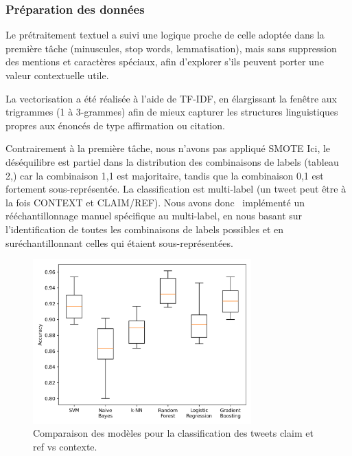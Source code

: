 \subsubsection{Préparation des données}
Le prétraitement textuel a suivi une logique proche de celle adoptée dans la première tâche (minuscules, stop words, lemmatisation), mais sans suppression des mentions et caractères 	spéciaux, afin d’explorer s’ils peuvent porter une valeur contextuelle utile.

La vectorisation a été réalisée à l’aide de TF-IDF, en élargissant la fenêtre aux trigrammes (1 à 3-grammes) afin de mieux capturer les structures linguistiques propres aux énoncés de type affirmation ou citation.

Contrairement à la première tâche, nous n’avons pas appliqué SMOTE Ici, le déséquilibre est partiel dans la distribution des combinaisons de labels (tableau 2,) car la combinaison {1,1} est majoritaire, tandis que la combinaison {0,1} est fortement sous-représentée. La classification est multi-label (un tweet 	peut être à la fois CONTEXT et CLAIM/REF). Nous avons donc  implémenté un rééchantillonnage manuel spécifique au multi-label, en nous basant sur l’identification de toutes les combinaisons de labels possibles et en suréchantillonnant celles qui étaient sous-représentées. 
\begin{figure}[H]
    \centering
    \includegraphics[width=0.75\textwidth]{images/model_comparison_2}
    \caption{Comparaison des modèles pour la classification des tweets claim et ref vs contexte.}
    \label{fig:model_comparison_clmref_context}
\end{figure}

